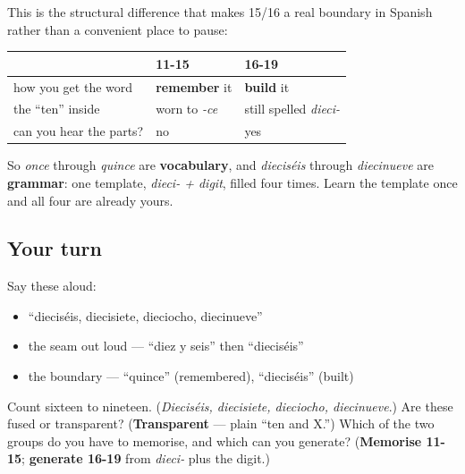 \begin{grammarlens}[title={Grammar Lens: a formula, not a list}]
This is the structural difference that makes 15/16 a real boundary in Spanish rather than a convenient place to pause:

\noindent
\begin{tabularx}{\linewidth}{@{}>{\raggedright\arraybackslash}X>{\raggedright\arraybackslash}X>{\raggedright\arraybackslash}X@{}}
\toprule
\textbf{} & \textbf{11-15} & \textbf{16-19} \\
\midrule
how you get the word & \textbf{remember} it & \textbf{build} it \\
the \textquotedblleft{}ten\textquotedblright{} inside & worn to \emph{-ce} & still spelled \emph{dieci-} \\
can you hear the parts? & no & yes \\
\bottomrule
\end{tabularx}

So \emph{once} through \emph{quince} are \textbf{vocabulary}, and \emph{dieciséis} through \emph{diecinueve} are \textbf{grammar}: one template, \emph{dieci- + digit}, filled four times. Learn the template once and all four are already yours.
\end{grammarlens}

\subsection*{Your turn}
Say these aloud:

\begin{itemize}
\raggedright
  \item \textquotedblleft{}dieciséis, diecisiete, dieciocho, diecinueve\textquotedblright{}
  \item the seam out loud — \textquotedblleft{}diez y seis\textquotedblright{} then \textquotedblleft{}dieciséis\textquotedblright{}
  \item the boundary — \textquotedblleft{}quince\textquotedblright{} (remembered), \textquotedblleft{}dieciséis\textquotedblright{} (built)
\end{itemize}

\begin{tcolorbox}[breakable,colback=teal!4,colframe=teal!35!black,title={Before you move on}]
Count sixteen to nineteen. (\emph{Dieciséis, diecisiete, dieciocho, diecinueve}.) Are these fused or transparent? (\textbf{Transparent} — plain \textquotedblleft{}ten and X.\textquotedblright{}) Which of the two groups do you have to memorise, and which can you generate? (\textbf{Memorise 11-15}; \textbf{generate 16-19} from \emph{dieci-} plus the digit.)
\end{tcolorbox}
